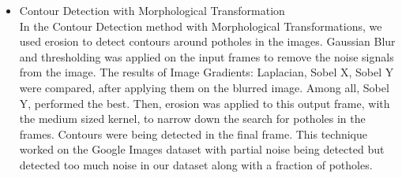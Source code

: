 \documentclass[12pt,a4paper]{article}
\begin{document}
\begin{itemize}
    



%    
%    


\newpage
    
\item Contour Detection with Morphological Transformation \\

In the Contour Detection method with Morphological Transformations, we used erosion to detect contours around potholes in the images. Gaussian Blur and thresholding was applied on the input frames to remove the noise signals from the image. The results of Image Gradients: Laplacian, Sobel X, Sobel Y were compared, after applying them on the blurred image. Among all, Sobel Y, performed the best. Then, erosion was applied to this output frame, with the medium sized kernel, to narrow down the search for potholes in the frames. Contours were being detected in the final frame. This technique worked on the Google Images dataset with partial noise being detected but detected too much noise in our dataset along with a fraction of potholes.    





\end{itemize}
\end{document}
